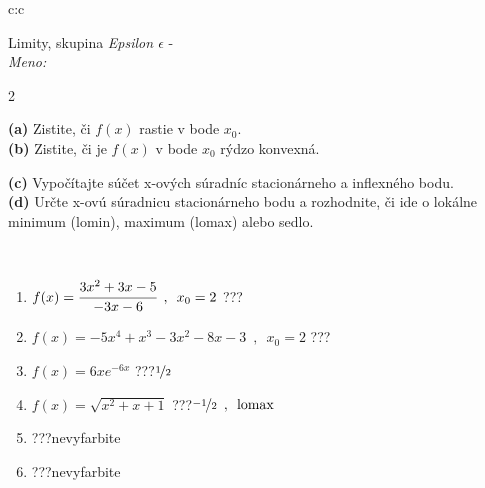 \documentclass[10pt]{report}
\begin{document}
\begin{tabular}{c:c}
\begin{minipage}[c][104.5mm][t]{0.5\linewidth}
\begin{center}
\vspace{7mm}
{\huge Limity, skupina \textit{Epsilon $\epsilon$} -}\\[5mm]
\textit{Meno:}\phantom{xxxxxxxxxxxxxxxxxxxxxxxxxxxxxxxxxxxxxxxxxxxxxxxxxxxxxxxxxxxxxxxxx}\\[5mm]
\begin{minipage}{0.95\linewidth}
\begin{center}
{\small \begin{multicols}{2} \raggedright
\textbf{(a)} Zistite, či \(f(x)\) rastie v bode \(x_0\). \\[1mm]
\textbf{(b)} Zistite, či je \(f(x)\) v bode \(x_0\) rýdzo konvexná. \par \columnbreak
\textbf{(c)} Vypočítajte súčet x-ových súradníc stacionárneho a inflexného bodu. \\[1mm]
\textbf{(d)} Určte x-ovú súradnicu stacionárneho bodu a rozhodnite, či ide o lokálne minimum (lomin), maximum (lomax) alebo sedlo. \\[1mm]
\end{multicols}
}
\end{center}
\end{minipage}
\\[4mm]
\begin{minipage}{0.79\linewidth}
\begin{center}
\begin{varwidth}{\linewidth}
\begin{enumerate}
\normalsize
\item $f(x)=\cfrac{3x^2+3x-5}{-3x-6}\enspace , \enspace x_0=2$\quad \dotfill\; ???\;\dotfill \quad {}
\item $f(x)=-5x^4+x^3-3x^2-8x-3\enspace , \enspace x_0=2$\quad \dotfill\; ???\;\dotfill \quad {}
\item $f(x)=6xe^{-6x}$\quad \dotfill\; ???\;\dotfill \quad $\nicefrac{1}{2}$
\item $f(x)=\sqrt{x^2+x+1}$\quad \dotfill\; ???\;\dotfill \quad $\nicefrac{-1}{2}\enspace , \enspace\text{lomax}$
\item \quad \dotfill\; ???\;\dotfill \quad nevyfarbite
\item \quad \dotfill\; ???\;\dotfill \quad nevyfarbite
\end{enumerate}
\end{varwidth}

\end{center}
\end{minipage}
\end{center}
\end{minipage}
\end{tabular}
\end{document}
